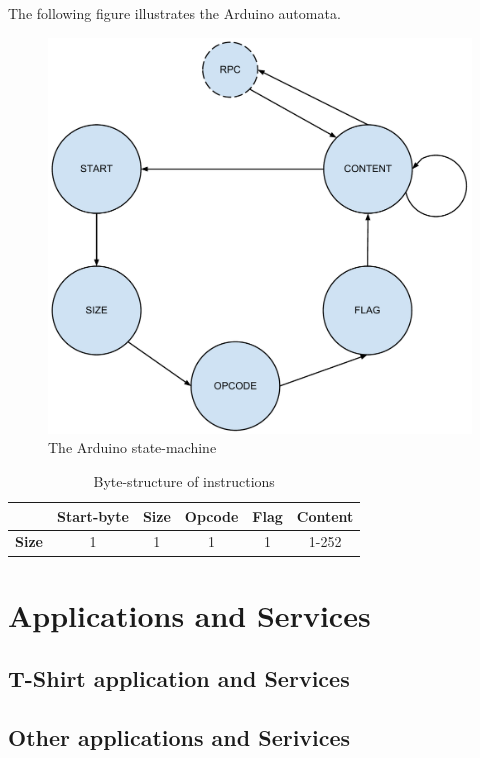 The following figure illustrates the Arduino automata.

\begin{figure}[h!]
\centering
\includegraphics[width=\textwidth, keepaspectratio]{img/arduino_state-machine.pdf}
\caption{The Arduino state-machine}
\label{fig:arduino_states}
\end{figure}

\begin{table}
\begin{tabular}{c|c|c|c|c|c|}
\cline{2-6}
& \textbf{Start-byte} & \textbf{Size} & \textbf{Opcode} & \textbf{Flag} & \textbf{Content} \\
\hline
\multicolumn{1}{|c|}{\textbf{Size}} & 1 & 1 & 1 & 1 & 1-252 \\
\hline
\end{tabular}
\caption{Byte-structure of instructions}
\label{tbl:instr_struct}
\end{table}

\newpage
\section{Applications and Services}
\subsection{T-Shirt application and Services}
\subsection{Other applications and Serivices}

